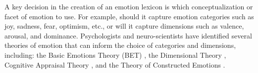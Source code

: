 \documentclass[11pt]{article}
\begin{document}
{} A key decision in the creation of an emotion lexicon is 
which conceptualization or facet of emotion to use.
For example, should it capture emotion categories such as joy, sadness, fear, optimism, etc., or will it capture dimensions such as valence, arousal, and dominance.
Psychologists and neuro-scientists have identified several theories of emotion that can inform the choice of categories and dimensions, including: the Basic Emotions Theory (BET) \cite{ekman1992there,ekman1994nature}, the Dimensional Theory \cite{osgood1957measurement,russell1980circumplex,russell1977evidence,russell2003core},
Cognitive Appraisal Theory \cite{scherer1999appraisal,lazarus1991progress}, and the Theory of Constructed Emotions \cite{barrett2017theory}.
\end{document}
